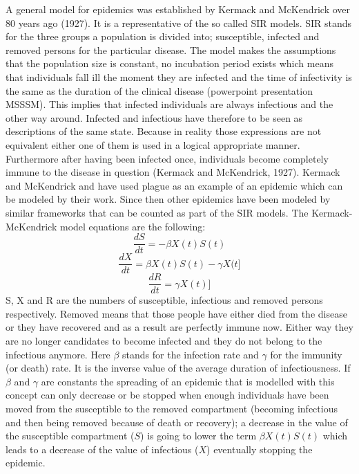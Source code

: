 \documentclass[11pt]{article}
\begin{document}
A general model for epidemics was established by Kermack and McKendrick over 80 years ago (1927). It is a representative of the so called SIR models. SIR stands for the three groups a population is divided into; susceptible, infected and removed persons for the particular disease. The model makes the assumptions that the population size is constant, no incubation period exists which means that individuals fall ill the moment they are infected and the time of infectivity is the same as the duration of the clinical disease (powerpoint presentation MSSSM). This implies that infected individuals are always infectious and the other way around. Infected and infectious have therefore to be seen as descriptions of the same state. Because in reality those expressions are not equivalent either one of them is used in a logical appropriate manner. Furthermore after having been infected once, individuals become completely immune to the disease in question (Kermack and McKendrick, 1927). Kermack and McKendrick and have used plague as an example of an epidemic which can be modeled by their work. Since then other epidemics have been modeled by similar frameworks that can be counted as part of the SIR models.
The Kermack-McKendrick model equations are the following:
\begin{equation*}
\dfrac{dS}{dt}=-\beta X(t)S(t)
\end{equation*}
\begin{equation*}
\dfrac{dX}{dt}=\beta X(t)S(t)-\gamma X(t]
\end{equation*}
\begin{equation*}
\dfrac{dR}{dt}=\gamma X(t)]
\end{equation*}
S, X and R are the numbers of susceptible, infectious and removed persons respectively. Removed means that those people have either died from the disease or they have recovered and as a result are perfectly immune now. Either way they are no longer candidates to become infected and they do not belong to the infectious anymore.
\linebreak 
Here $\beta$ stands for the infection rate and $\gamma$ for the immunity (or death) rate. It is the inverse value of the average duration of infectiousness. If $\beta$ and $\gamma$ are constants the spreading of an epidemic that is modelled with this concept can only decrease or be stopped when enough individuals have been moved from the susceptible to the removed compartment (becoming infectious and then being removed because of death or recovery); a decrease in the value of the susceptible compartment ($ S $) is going to lower the term $\beta X(t)S(t)$ which leads to a decrease of the value of infectious ($ X $) eventually stopping the epidemic.
\end{document}
